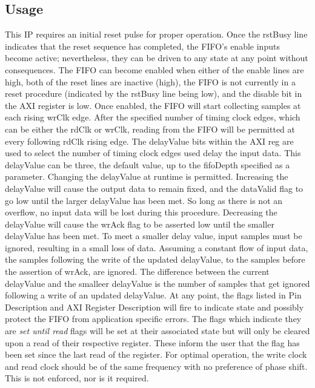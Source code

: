 \documentclass[11pt]{article}
\begin{document}
\subsection{Usage}
This IP requires an initial reset pulse for proper operation. Once the rstBusy line indicates that the reset sequence has completed, the FIFO's enable
inputs become active; nevertheless, they can be driven to any state at any point without consequences. The FIFO can become enabled when either of the
enable lines are high, both of the reset lines are inactive (high), the FIFO is not currently in a reset procedure (indicated by the rstBusy line being
low), and the disable bit in the AXI register is low. Once enabled, the FIFO will start collecting samples at each rising wrClk edge.
After the specified number of timing clock edges, which can be either the rdClk or wrClk, reading from the FIFO will be permitted at every following
rdClk rising edge.\hfill\break
The delayValue bits within the AXI reg are used to select the number of timing clock edges used delay the input data. This delayValue can be three, the
default value, up to the fifoDepth specified as a parameter.
Changing the delayValue at runtime is permitted. Increasing the delayValue will cause the output data to remain fixed, and the dataValid flag to go low
until the larger delayValue has been met. So long as there is not an overflow, no input data will be lost during this procedure. Decreasing the delayValue
will cause the wrAck flag to be asserted low until the smaller delayValue has been met. To meet a smaller delay value, input samples must be ignored,
resulting in a small loss of data. Assuming a constant flow of input data, the samples following the write of the updated delayValue, to the samples
before the assertion of wrAck, are ignored. The difference between the current delayValue and the smalleer delayValue is the number of samples that get
ignored following a write of an updated delayValue.\hfill\break
At any point, the flags listed in Pin Description and  AXI Register Description will fire to indicate state and possibly protect the FIFO from application
specific errors. The flags which indicate they are \textit{set until read} flags will be set at their associated state but will only be cleared upon a
read of their respective register. These inform the user that the flag has been set since the last read of the register.\hfill\break
For optimal operation, the write clock and read clock should be of the same frequency with no preference of phase shift. This is not enforced, nor is it
required.
\end{document}
